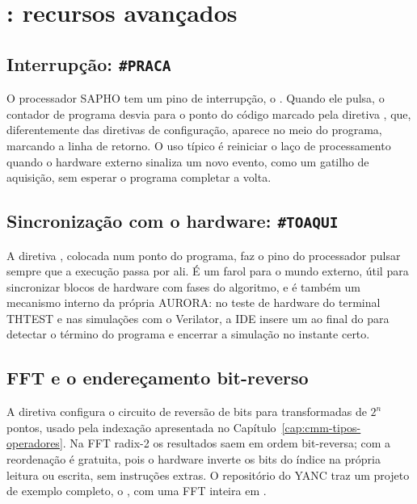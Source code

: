 \chapter{\cmm{}: recursos avançados}
\label{cap:cmm-avancado}

\section{Interrupção: \texttt{\#PRACA}}

O processador SAPHO tem um pino de interrupção, o . Quando ele pulsa, o contador de programa desvia para o ponto do código marcado pela diretiva , que, diferentemente das diretivas de configuração, aparece no meio do programa, marcando a linha de retorno. O uso típico é reiniciar o laço de processamento quando o hardware externo sinaliza um novo evento, como um gatilho de aquisição, sem esperar o programa completar a volta.

\section{Sincronização com o hardware: \texttt{\#TOAQUI}}
\label{sec:toaqui}

A diretiva , colocada num ponto do programa, faz o pino  do processador pulsar sempre que a execução passa por ali. É um farol para o mundo externo, útil para sincronizar blocos de hardware com fases do algoritmo, e é também um mecanismo interno da própria AURORA: no teste de hardware do terminal THTEST e nas simulações com o Verilator, a IDE insere um  ao final do  para detectar o término do programa e encerrar a simulação no instante certo.

\section{FFT e o endereçamento bit-reverso}

A diretiva  configura o circuito de reversão de bits para transformadas de $2^n$ pontos, usado pela indexação \code{x[k)} apresentada no Capítulo~\ref{cap:cmm-tipos-operadores}. Na FFT radix-2 os resultados saem em ordem bit-reversa; com \code{x[k)} a reordenação é gratuita, pois o hardware inverte os bits do índice na própria leitura ou escrita, sem instruções extras. O repositório do YANC traz um projeto de exemplo completo, o , com uma FFT inteira em \cmm{}.

